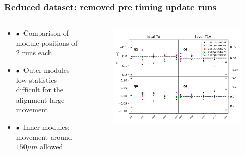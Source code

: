 \documentclass[xcolor=dvipsnames, aspectratio=1610, 12pt]{beamer}
\begin{document}
\begin{frame}\frametitle{Reduced dataset: removed pre timing update runs}
  \begin{columns}
    \begin{column}[c]{0.48\textwidth}
      \begin{itemize}
        \item $\bullet$\, Comparison of module positions of 2 runs each
        \item $\bullet$\, Outer modules \to low statistics \to difficult for the alignment \to large movement
        \item $\bullet$\, Inner modules: movement around $150 \mu m$ allowed
      \end{itemize}
    \end{column}
      \begin{column}[c]{0.48\textwidth}
        \begin{figure}
          \includegraphics[width=\textwidth]{plots/diff_reduced_Tx_T1V_Tx.pdf}
        \end{figure}
      \end{column}
  \end{columns}
\end{frame}
\end{document}
